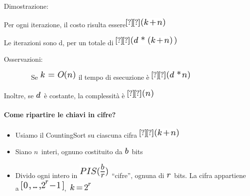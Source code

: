 \documentclass{article}
\providecommand{\tightlist}{%
  \setlength{\itemsep}{0pt}\setlength{\parskip}{0pt}}
\let\oldparagraph\paragraph
\renewcommand{\paragraph}[1]{\oldparagraph{#1}\mbox{}}
\begin{document}
{{Dimostrazione:}

{Per ogni iterazione, il costo risulta essere}\includegraphics{images/image198.png}

{Le iterazioni sono d, per un totale di
}\includegraphics{images/image196.png}

{Osservazioni}{:}

{~~~~~~~~Se }\includegraphics{images/image189.png}{~il tempo di
esecuzione è }\includegraphics{images/image199.png}

{Inoltre, se }\includegraphics{images/image197.png}{~è
costante, la complessità è }\includegraphics{images/image149.png}

\hypertarget{h.u6e4yemegdiq}{\paragraph{\texorpdfstring{{Come ripartire
le chiavi in
cifre?}}{Come ripartire le chiavi in cifre?}}\label{h.u6e4yemegdiq}}

\begin{itemize}
\tightlist
\item
  {Usiamo il CountingSort su ciascuna cifra
  }\includegraphics{images/image198.png}
\item
  {Siano }$n${~interi, ognuno
  costituito da }\includegraphics{images/image200.png}{~bits}
\item
  {Divido ogni intero in
  }\includegraphics{images/image201.png}{~``cifre'', ognuna di
  }\includegraphics{images/image83.png}{~bits. La cifra appartiene a
  }\includegraphics{images/image202.png}{,
  }\includegraphics{images/image203.png}
\end{itemize}

}
\end{document}
